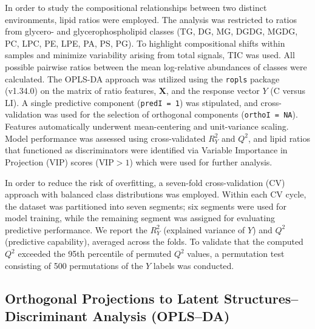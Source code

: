\documentclass[10pt,letterpaper]{article}
\begin{document}
In order to study the compositional relationships between two distinct environments, lipid ratios were employed. The analysis was restricted to ratios from glycero- and glycerophospholipid classes (TG, DG, MG, DGDG, MGDG, PC, LPC, PE, LPE, PA, PS, PG). To highlight compositional shifts within samples and minimize variability arising from total signals, TIC was used. All possible pairwise ratios between the mean log-relative abundances of classes were calculated. The OPLS-DA approach was utilized using the \texttt{ropls} package (v1.34.0) on the matrix of ratio features, \(\mathbf{X}\), and the response vector \(Y\) (C versus LI). A single predictive component (\texttt{predI = 1}) was stipulated, and cross-validation was used for the selection of orthogonal components (\texttt{orthoI = NA}). Features automatically underwent mean-centering and unit-variance scaling. Model performance was assessed using cross-validated \(R^{2}_{Y}\) and \(Q^{2}\), and lipid ratios that functioned as discriminators were identified via Variable Importance in Projection (VIP) scores (\(\text{VIP} > 1\)) which were used for further analysis.

In order to reduce the risk of overfitting, a seven-fold cross-validation (CV) approach with balanced class distributions was employed. Within each CV cycle, the dataset was partitioned into seven segments; six segments were used for model training, while the remaining segment was assigned for evaluating predictive performance. We report the \(R^{2}_{Y}\) (explained variance of \(Y\)) and \(Q^{2}\) (predictive capability), averaged across the folds. To validate that the computed \(Q^{2}\) exceeded the 95th percentile of permuted \(Q^{2}\) values, a permutation test consisting of 500 permutations of the \(Y\) labels was conducted.




\subsection*{Orthogonal Projections to Latent Structures–Discriminant Analysis (OPLS–DA)}
\end{document}
